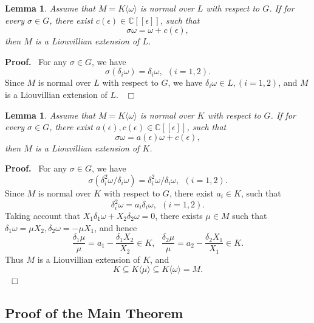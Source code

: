 \documentclass[preprint, 12pt]{elsarticle}
\newtheorem{lem}[thm]{Lemma}
\numberwithin{equation}{section}
\newenvironment{proof}[1][Proof]{\textbf{#1.}\ }{\ $\Box$}
\newcommand{\Comp}{\mathbb{C}}
\begin{document}
\begin{lem}
\label{le:35} Assume that $M = K\langle \omega \rangle$ is normal
over $L$ with respect to $G$. If for every $\sigma\in G$, there
exist $c(\epsilon)\in \Comp[[\epsilon]]$, such that
$$\sigma \omega = \omega + c(\epsilon),$$
then $M$ is a Liouvillian extension of $L$.
\end{lem}
\begin{proof}
For any $\sigma\in G$, we have
$$\sigma (\delta_i\omega) = \delta_i\omega,\ \ (i = 1,2).$$
Since $M$ is normal over $L$ with respect to $G$, we have
$\delta_i\omega\in L, (i = 1,2)$, and $M$ is a Liouvillian
extension of $L$.
\end{proof}

\begin{lem}
\label{le:30} Assume that $M = K\langle \omega \rangle$ is normal
over $K$ with respect to $G$. If for every $\sigma\in G$, there
exist $a(\epsilon), c(\epsilon)\in \Comp[[\epsilon]]$, such that
$$\sigma \omega = a(\epsilon) \omega + c(\epsilon),$$
then $M$ is a Liouvillian extension of $K$.
\end{lem}
\begin{proof}
For any $\sigma\in G$, we have
$$\sigma (\delta_i^2\omega/\delta_i\omega) = \delta_i^2\omega/\delta_i\omega,\ \ (i = 1,2).$$
Since $M$ is normal over $K$ with respect to $G$, there exist
$a_i\in K$, such that
$$\delta_i^2\omega = a_i \delta_i\omega, \ \ (i = 1,2).$$
Taking account that $X_1\delta_1\omega + X_2\delta_2\omega = 0$,
there exists $\mu\in M$ such that $\delta_1\omega = \mu X_2,
\delta_2\omega = -\mu X_1$, and hence
$$\dfrac{\delta_1\mu}{\mu} = a_1 - \dfrac{\delta_1 X_2}{X_2} \in K,\ \ \
\dfrac{\delta_2\mu}{\mu} = a_2 - \dfrac{\delta_2 X_1}{X_1}\in K.$$
Thus $M$ is a Liouvillian extension of $K$, and
$$K\subseteq K\langle\mu\rangle\subseteq K\langle \omega \rangle = M.$$
\end{proof}

\subsection{Proof of the Main Theorem}
\label{sec:4.2}
\end{document}

